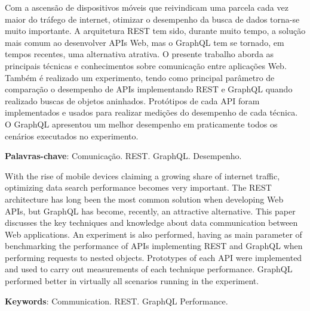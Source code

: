 \setlength{\absparsep}{18pt} %
\begin{resumo}

    Com a ascensão de dispositivos móveis que reivindicam uma parcela cada vez maior do tráfego de internet, otimizar o desempenho da busca de dados torna-se muito importante. A arquitetura REST tem sido, durante muito tempo, a solução mais comum ao desenvolver APIs Web, mas o GraphQL tem se tornado, em tempos recentes, uma alternativa atrativa. O presente trabalho aborda as principais técnicas e conhecimentos sobre comunicação entre aplicações Web. Também é realizado um experimento, tendo como principal parâmetro de comparação o desempenho de APIs implementando REST e GraphQL quando realizado buscas de objetos aninhados. Protótipos de cada API foram implementados e usados para realizar medições do desempenho de cada técnica. O GraphQL apresentou um melhor desempenho em praticamente todos os cenários executados no experimento.

\textbf{Palavras-chave}: Comunicação. REST. GraphQL. Desempenho.

\end{resumo}

\begin{resumo}[Abstract]
 
    With the rise of mobile devices claiming a growing share of internet traffic, optimizing data search performance becomes very important. The REST architecture has long been the most common solution when developing Web APIs, but GraphQL has become, recently, an attractive alternative. This paper discusses the key techniques and knowledge about data communication between Web applications. An experiment is also performed, having as main parameter of benchmarking the performance of APIs implementing REST and GraphQL when performing requests to nested objects. Prototypes of each API were implemented and used to carry out measurements of each technique performance. GraphQL performed better in virtually all scenarios running in the experiment.

   \vspace{\onelineskip}
 
   \noindent 
   \textbf{Keywords}: Communication. REST. GraphQL Performance.
 
\end{resumo}
